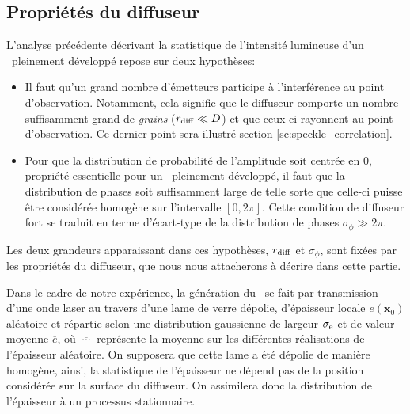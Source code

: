 \subsection{Propriétés du diffuseur}
\label{sc:prop_diffuseur}
L'analyse précédente décrivant la statistique de l'intensité lumineuse d'un \speckle\ pleinement développé repose sur deux hypothèses: 
\begin{itemize}
\item[\textendash] Il faut qu'un grand nombre d'émetteurs participe à l'interférence au point d'observation. Notamment, cela signifie que le diffuseur comporte un nombre suffisamment grand de \emph{grains} ($r_{\mathrm{diff}} \ll D$)  et que ceux-ci rayonnent au point d'observation. Ce dernier point sera illustré section \ref{sc:speckle_correlation}.
\item[\textendash] Pour que la distribution de probabilité de l'amplitude soit centrée en 0, propriété essentielle pour un \speckle\ pleinement développé, il faut que la distribution de phases soit suffisamment large de telle sorte que celle-ci puisse être considérée homogène sur l'intervalle $\left[ 0,2\pi \right]$. Cette condition de diffuseur fort se traduit en terme d'écart-type de la distribution de phases $\sigma_\phi \gg 2\pi$. 
\end{itemize}
Les deux grandeurs apparaissant dans ces hypothèses, $r_{\mathrm{diff}}$ et $\sigma_\phi$, sont fixées par les propriétés du diffuseur, que nous nous attacherons à décrire dans cette partie.

Dans le cadre de notre expérience, la génération du \speckle\ se fait par transmission d'une onde laser au travers d'une lame de verre dépolie, d'épaisseur locale $e(\mathbf{x}_0)$ aléatoire et répartie selon une distribution gaussienne de largeur $\sigma_{\mathrm{e}}$ et de valeur moyenne $\overline{e}$, où $\overline{\:\cdots\:}$ représente la moyenne sur les différentes réalisations de l'épaisseur aléatoire. On supposera que cette lame a été dépolie de manière homogène, ainsi, la statistique de l'épaisseur ne dépend pas de la position considérée sur la surface du diffuseur. On assimilera donc la distribution de l'épaisseur à un processus stationnaire. 

